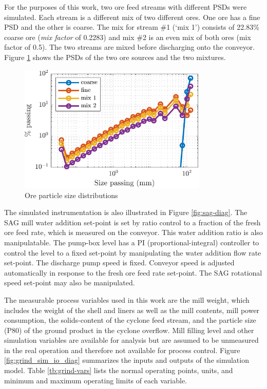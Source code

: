 For the purposes of this work, two ore feed streams with different PSDs were simulated. Each stream is a different mix of two different ores. One ore has a fine PSD and the other is coarse. The mix for stream \#1 (`mix 1') consists of 22.83\% coarse ore (\textit{mix factor} of 0.2283) and mix \#2 is an even mix of both ores (mix factor of 0.5). The two streams are mixed before discharging onto the conveyor. Figure \ref{fig:coarse_fine_psd_plot} shows the PSDs of the two ore sources and the two mixtures.

\begin{figure}[htp]
	\centering
	\includegraphics[width=9cm]{images/coarse_fine_psd_plot.pdf}
	\caption{Ore particle size distributions}
	\label{fig:coarse_fine_psd_plot}
\end{figure}

The simulated instrumentation is also illustrated in Figure \ref{fig:sag-diag}. The SAG mill water addition set-point is set by ratio control to a fraction of the fresh ore feed rate, which is measured on the conveyor. This water addition ratio is also manipulatable. The pump-box level has a PI (proportional-integral) controller to control the level to a fixed set-point by manipulating the water addition flow rate set-point. The discharge pump speed is fixed. Conveyor speed is adjusted automatically in response to the fresh ore feed rate set-point. The SAG rotational speed set-point may also be manipulated.

The measurable process variables used in this work are the mill weight, which includes the weight of the shell and liners as well as the mill contents, mill power consumption, the solids-content of the cyclone feed stream, and the particle size (P80) of the ground product in the cyclone overflow. Mill filling level and other simulation variables are available for analysis but are assumed to be unmeasured in the real operation and therefore not available for process control.  Figure \ref{fig:grind_sim_io_diag} summarizes the inputs and outputs of the simulation model. Table \ref{tb:grind-vars} lists the normal operating points, units, and minimum and maximum operating limits of each variable.

